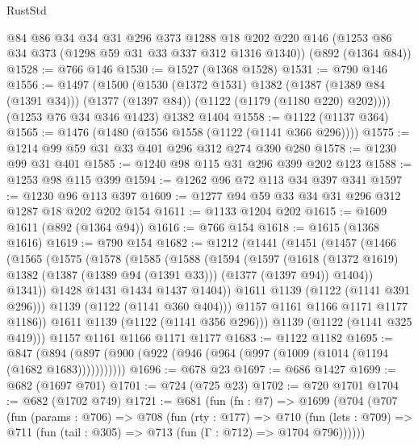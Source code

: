 \begin{lexlean}{RustStd}
\begin{coremodule}
    @84
    @86
    @34
    @34
    @31
    @296
    @373
    @1288
    @18
    @202
    @220
    @146
    (@1253 @86 @34 @373 (@1298 @59 @31 @33 @337 @312 @1316 @1340))
    (@892 (@1364 @84))
@1528 := @766 @146
@1530 := @1527 (@1368 @1528)
@1531 := @790 @146
@1556 := @1497
    (@1500
      (@1530
        (@1372 @1531)
        @1382
        (@1387 (@1389 @84 (@1391 @34)))
        (@1377 (@1397 @84))
        (@1122 (@1179 (@1180 @220) @202))))
    (@1253 @76 @34 @346 @1423)
    @1382
    @1404
@1558 := @1122 (@1137 @364)
@1565 := @1476 (@1480 (@1556 @1558 (@1122 (@1141 @366 @296))))
@1575 := @1214 @99 @59 @31 @33 @401 @296 @312 @274 @390 @280
@1578 := @1230 @99 @31 @401
@1585 := @1240 @98 @115 @31 @296 @399 @202 @123
@1588 := @1253 @98 @115 @399
@1594 := @1262 @96 @72 @113 @34 @397 @341
@1597 := @1230 @96 @113 @397
@1609 := @1277 @94 @59 @33 @34 @31 @296 @312 @1287 @18 @202 @202 @154
@1611 := @1133 @1204 @202
@1615 := @1609 @1611 (@892 (@1364 @94))
@1616 := @766 @154
@1618 := @1615 (@1368 @1616)
@1619 := @790 @154
@1682 := @1212
    (@1441
      (@1451
        (@1457
          (@1466
            (@1565
              (@1575
                (@1578
                  (@1585
                    (@1588
                      (@1594
                        (@1597
                          (@1618
                            (@1372 @1619)
                            @1382
                            (@1387 (@1389 @94 (@1391 @33)))
                            (@1377 (@1397 @94))
                            @1404))
                        @1341))
                    @1428
                    @1431
                    @1434
                    @1437
                    @1404))
                @1611
                @1139
                (@1122 (@1141 @391 @296)))
              @1139
              (@1122 (@1141 @360 @404)))
            @1157
            @1161
            @1166
            @1171
            @1177
            @1186))
        @1611
        @1139
        (@1122 (@1141 @356 @296)))
      @1139
      (@1122 (@1141 @325 @419)))
    @1157
    @1161
    @1166
    @1171
    @1177
@1683 := @1122 @1182
@1695 := @847 (@894 (@897 (@900 (@922 (@946 (@964 (@997 (@1009 (@1014 (@1194 (@1682 @1683)))))))))))
@1696 := @678 @23
@1697 := @686 @1427
@1699 := @682 (@1697 @701)
@1701 := @724 (@725 @23)
@1702 := @720 @1701
@1704 := @682 (@1702 @749)
@1721 := @681
    (fun (fn : @7) =>
    @1699
      (@704
        (@707
          (fun (params : @706) =>
          @708
            (fun (rty : @177) =>
            @710
              (fun (lets : @709) =>
              @711 (fun (tail : @305) => @713 (fun (Γ : @712) => @1704 @796))))))

\end{coremodule}
\end{lexlean}
